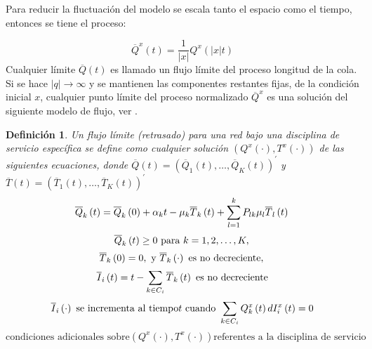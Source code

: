\documentclass{article}
\newtheorem{Def}{Definición}[section]
\numberwithin{equation}{section}
\begin{document}
Para reducir la fluctuaci\'on del modelo se escala tanto el
espacio como el tiempo, entonces se tiene el proceso:

\begin{equation}
\overline{Q}^{x}\left(t\right)=\frac{1}{|x|}Q^{x}\left(|x|t\right)
\end{equation}
Cualquier l\'imite $\overline{Q}\left(t\right)$ es llamado un
flujo l\'imite del proceso longitud de la cola. Si se hace
$|q|\rightarrow\infty$ y se mantienen las componentes restantes
fijas, de la condici\'on inicial $x$, cualquier punto l\'imite del
proceso normalizado $\overline{Q}^{x}$ es una soluci\'on del
siguiente modelo de flujo, ver \cite{Dai}.

\begin{Def}
Un flujo l\'imite (retrasado) para una red bajo una disciplina de
servicio espec\'ifica se define como cualquier soluci\'on
 $\left(Q^{x}\left(\cdot\right),T^{x}\left(\cdot\right)\right)$ de las siguientes ecuaciones, donde
$\overline{Q}\left(t\right)=\left(\overline{Q}_{1}\left(t\right),\ldots,\overline{Q}_{K}\left(t\right)\right)^{'}$
y
$\overline{T}\left(t\right)=\left(\overline{T}_{1}\left(t\right),\ldots,\overline{T}_{K}\left(t\right)\right)^{'}$
\begin{equation}\label{Eq.3.8}
\overline{Q}_{k}\left(t\right)=\overline{Q}_{k}\left(0\right)+\alpha_{k}t-\mu_{k}\overline{T}_{k}\left(t\right)+\sum_{l=1}^{k}P_{lk}\mu_{l}\overline{T}_{l}\left(t\right)\\
\end{equation}
\begin{equation}\label{Eq.3.9}
\overline{Q}_{k}\left(t\right)\geq0\textrm{ para }k=1,2,\ldots,K,\\
\end{equation}
\begin{equation}\label{Eq.3.10}
\overline{T}_{k}\left(0\right)=0,\textrm{ y }\overline{T}_{k}\left(\cdot\right)\textrm{ es no decreciente},\\
\end{equation}
\begin{equation}\label{Eq.3.11}
\overline{I}_{i}\left(t\right)=t-\sum_{k\in C_{i}}\overline{T}_{k}\left(t\right)\textrm{ es no decreciente}\\
\end{equation}
\begin{equation}\label{Eq.3.12}
\overline{I}_{i}\left(\cdot\right)\textrm{ se incrementa al tiempo}t\textrm{ cuando }\sum_{k\in C_{i}}Q_{k}^{x}\left(t\right)dI_{i}^{x}\left(t\right)=0\\
\end{equation}
\begin{equation}\label{Eq.3.13}
\textrm{condiciones adicionales sobre
}\left(Q^{x}\left(\cdot\right),T^{x}\left(\cdot\right)\right)\textrm{
referentes a la disciplina de servicio}
\end{equation}
\end{Def}
\end{document}
